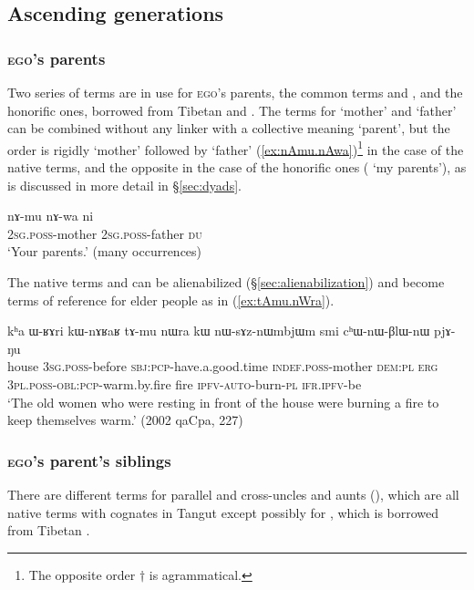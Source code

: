  \subsection{Ascending generations} \label{sec:G+1}
 
 \subsubsection{\textsc{ego}'s parents}
Two series of terms are in use for \textsc{ego}'s parents, the common terms  and , and the honorific ones, borrowed from Tibetan  and . The terms for `mother' and `father' can be combined without any linker with a collective meaning `parent', but the order is rigidly `mother' followed by `father' (\ref{ex:nAmu.nAwa})\footnote{The opposite order $\dagger$ is agrammatical. } in the case of the native terms, and the opposite in the case of the honorific ones  ( `my parents'), as is discussed in more detail in §\ref{sec:dyads}.

\begin{exe}
\ex \label{ex:nAmu.nAwa}
\gll nɤ-mu nɤ-wa ni  \\
\textsc{2sg}.\textsc{poss}-mother \textsc{2sg}.\textsc{poss}-father \textsc{du} \\
\glt  `Your parents.' (many occurrences)
\end{exe}

The native terms   and  can be alienabilized (§\ref{sec:alienabilization}) and become terms of reference for elder people as in (\ref{ex:tAmu.nWra}).

\begin{exe}
\ex \label{ex:tAmu.nWra}
\gll  kʰa ɯ-ʁɤri kɯ-nɤʁaʁ tɤ-mu nɯra kɯ nɯ-sɤz-nɯmbjɯm smi cʰɯ-nɯ-βlɯ-nɯ pjɤ-ŋu  \\
house \textsc{3sg}.\textsc{poss}-before \textsc{sbj}:\textsc{pcp}-have.a.good.time \textsc{indef}.\textsc{poss}-mother \textsc{dem}:\textsc{pl} \textsc{erg} \textsc{3pl}.\textsc{poss}-\textsc{obl}:\textsc{pcp}-warm.by.fire fire \textsc{ipfv}-\textsc{auto}-burn-\textsc{pl} \textsc{ifr}.\textsc{ipfv}-be \\
\glt `The old women who were resting in front of the house were burning a fire to keep themselves warm.' (2002 qaCpa, 227)
\end{exe}
 
 \subsubsection{\textsc{ego}'s parent's siblings} \label{sec:uncle.aunt}
There are different terms for parallel and cross-uncles and aunts (), which are all native terms with cognates in Tangut \citep{jacques12kinship} except possibly for , which is borrowed from Tibetan . 
 
